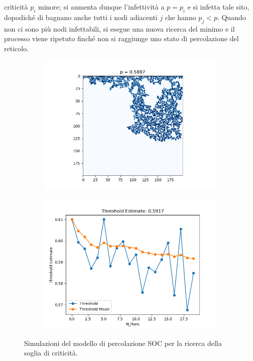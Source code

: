 \documentclass{article}
\begin{document}
    criticità $p_i$ minore; si aumenta dunque l'infettività a $p=p_i$ e si infetta tale sito, dopodiché di bagnano anche
    tutti i nodi adiacenti $j$ che hanno $p_j<p$. Quando non ci sono più nodi infettabili, si esegue una nuova ricerca del minimo
    e il processo viene ripetuto finché non si raggiunge uno stato di percolazione del reticolo.\\
    \begin{figure}[H]
        \centering
        \begin{subfigure}[b]{0.49\linewidth}
         \centering
         \includegraphics[width=\linewidth]{../images/invasionpercolation_image}
     \end{subfigure}
        \hfill
        \begin{subfigure}[b]{0.49\linewidth}
         \centering
         \includegraphics[width=\linewidth]{../images/invasionpercolation}
     \end{subfigure}
     \caption{Simulazioni del modello di percolazione SOC per la ricerca della soglia di criticità.}
     \label{fig:invasion_percolation}
    \end{figure}
\end{document}
